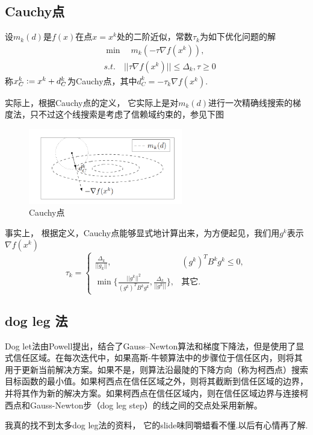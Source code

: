 \subsection{Cauchy点}
\begin{definition}[Cauchy点]
	设$m_k(d)$是$f(x)$在点$x=x^k$处的二阶近似，常数$\tau_k$为如下优化问题的解
	\begin{equation*}
		\begin{split}
			&\min\quad m_k(-\tau \nabla f(x^k)),\\
			&s.t.\quad ||\tau \nabla f(x^k)||\leq \Delta_k, \tau\geq 0
		\end{split}
	\end{equation*}
	称$x_C^k\vcentcolon = x^k + d_C^k$为Cauchy点，其中$d_C^k = -\tau_k\nabla f(x^k)$.
\end{definition}
实际上，根据Cauchy点的定义， 它实际上是对$m_k(d)$进行一次精确线搜索的梯度法，只不过这个线搜索是考虑了信赖域约束的，参见下图
\begin{figure}[h!]
\caption{Cauchy点}
\centering
\includegraphics[width=0.6\textwidth]{img/cauchypoint.png}
\end{figure}
事实上， 根据定义，Cauchy点能够显式地计算出来，为方便起见，我们用$g^k$表示$\nabla f(x^k)$
\begin{equation*}
	\tau_k = \begin{cases}
		\frac{\Delta_k}{||g_k||}, & (g^k)^TB^kg^k\leq 0,\\
		\min\{\frac{||g^k||^2}{(g^k)^TB^kg^k},\frac{\Delta_k}{||g^k||}\}, &\text{其它}.
	\end{cases}
\end{equation*}
\subsection{dog leg 法}
Dog let法由Powell提出，结合了Gauss–Newton算法和梯度下降法，但是使用了显式信任区域。在每次迭代中，如果高斯-牛顿算法中的步骤位于信任区内，则将其用于更新当前解决方案。如果不是，则算法沿最陡的下降方向（称为柯西点）搜索目标函数的最小值。如果柯西点在信任区域之外，则将其截断到信任区域的边界，并将其作为新的解决方案。如果柯西点在信任区域内，则在信任区域边界与连接柯西点和Gauss-Newton步（dog leg step）的线之间的交点处采用新解。\par
\begin{note}
	我真的找不到太多dog leg法的资料， 它的slide味同嚼蜡看不懂.以后有心情再了解.
\end{note}
